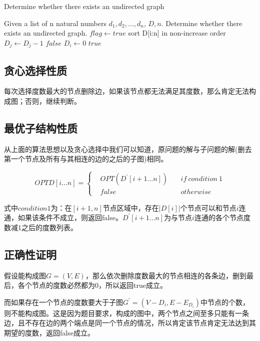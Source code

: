 \documentclass[UTF8,a4paper,12pt]{article}
\begin{document}
\begin{CJK}{UTF8}{gkai}
	\begin{algorithm}[htb]
		\caption{Determine whether there exists an undirected graph}
		\begin{algorithmic}[1]
			\Require
			Given a list of n natural numbers $ d_{1},d_{2},\dots,d_{n} $, $ D,n $.
			\Ensure
			Determine whether there exists an undirected graph.
				\State $ flag \gets true $
					\State sort D[i:n] in non-increase order					
							\State $ D_{j} \gets D_{j} - 1 $
						\Else
							\State \Return $ false $
						\EndIf
						\State $ D_{i} \gets 0 $
					\EndFor
				\EndFor
				\State \Return $ true $
			\EndFunction
		\end{algorithmic}
	\end{algorithm}

	\subsection{贪心选择性质}
		每次选择度数最大的节点删除边，如果该节点都无法满足其度数，那么肯定无法构成图；否则，继续判断。
	\subsection{最优子结构性质}
		从上面的算法思想以及贪心选择中我们可以知道，原问题的解与子问题的解(删去第一个节点及所有与其相连的边的之后的子图)相同。
		
		$$ OPT{D[i\dots n]} = \left\{
		\begin{aligned}
		& OPT(D^{'}[i+1\dots n]) &&\ if\ condition\ 1  \\
		& false	&&\ otherwise
		\end{aligned}
		\right.
		$$
		
		式中$ condition 1 $为：在$ [i+1,n] $节点区域中，存在$ |D[i]| $个节点可以和节点$ i $连通，如果该条件不成立，则返回false。$ D^{'}[i+1\dots n] $为与节点$ i $连通的各个节点度数减1之后的度数列表。
		
	\subsection{正确性证明}
		假设能构成图$ G = (V, E) $，那么依次删除度数最大的节点相连的各条边，删到最后，各个节点的度数必然都为0，所以返回true成立。
		
		而如果存在一个节点的度数要大于子图$ G^{'} = (V-D_{i}, E-E_{D_{i}}) $中节点的个数，则不能构成图。这是因为题目要求，构成的图中，两个节点之间至多只能有一条边，且不存在边的两个端点是同一个节点的情况，所以肯定该节点肯定无法达到其期望的度数，返回false成立。
		

\end{CJK}
\end{document}
